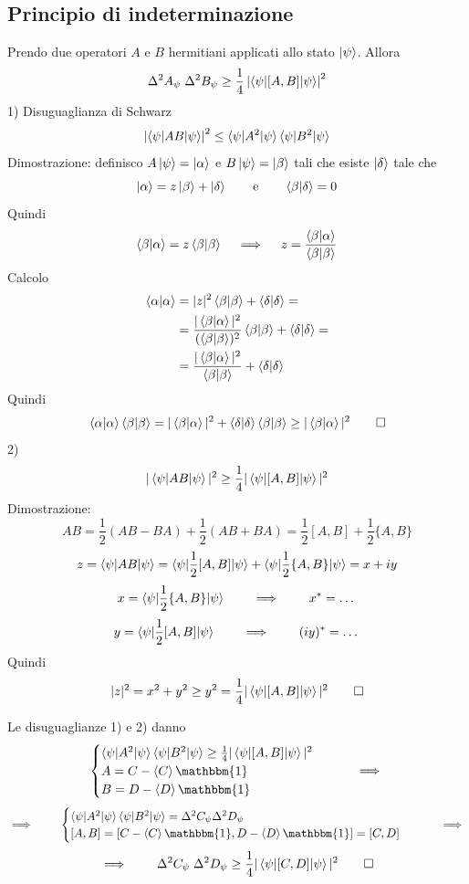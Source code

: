 \subsection{Principio di indeterminazione}
Prendo due operatori \(A\) e \(B\) hermitiani applicati allo stato \(\ket{\psi}\). Allora
\[
\Delta^2 A_\psi \; \Delta^2 B_\psi \geq \frac{1}{4} \left| \braket{\psi|[A, B]|\psi} \right|^2
\]
1) Disuguaglianza di Schwarz
\[
\left| \braket{\psi|AB|\psi} \right|^2 \leq \braket{\psi|A^2|\psi} \braket{\psi|B^2|\psi}
\]
Dimostrazione: definisco \(A\ket{\psi} = \ket{\alpha}\) e \(B\ket{\psi} = \ket{\beta}\) tali che esiste \(\ket{\delta}\) tale che
\[
\ket{\alpha} = z\ket{\beta} + \ket{\delta} \qquad \text{e} \qquad \braket{\beta|\delta} = 0
\]
Quindi
\[
\braket{\beta|\alpha} = z \braket{\beta|\beta} \quad \implies \quad z = \frac{\braket{\beta|\alpha}}{\braket{\beta|\beta}}
\]
Calcolo
\begin{align*}
\braket{\alpha|\alpha} & = |z|^2 \braket{\beta|\beta} + \braket{\delta|\delta} = \\
& = \frac{|\braket{\beta|\alpha}|^2}{(\braket{\beta|\beta})^2} \braket{\beta|\beta}  + \braket{\delta|\delta} = \\
& = \frac{|\braket{\beta|\alpha}|^2}{\braket{\beta|\beta}}  + \braket{\delta|\delta}
\end{align*}
Quindi
\[
\braket{\alpha|\alpha} \braket{\beta|\beta} = |\braket{\beta|\alpha}|^2 + \braket{\delta|\delta} \braket{\beta|\beta} \geq |\braket{\beta|\alpha}|^2 \qquad \square
\]
2)
\[
|\braket{\psi|AB|\psi}|^2 \geq \frac{1}{4} |\braket{\psi|[A,B]|\psi}|^2
\]
Dimostrazione:
\[
AB = \frac{1}{2} (AB - BA) + \frac{1}{2} (AB + BA) = \frac{1}{2} [A,B] + \frac{1}{2} \{A,B\}
\]
\[
z = \braket{\psi|AB|\psi} = \braket{\psi|\frac{1}{2}[A,B]|\psi} + \braket{\psi|\frac{1}{2}\{A,B\}|\psi} = x + iy
\]
\[
x = \braket{\psi|\frac{1}{2}\{A,B\}|\psi} \qquad \implies \qquad x^* = \dots
\]
\[
y = \braket{\psi|\frac{1}{2}[A,B]|\psi} \qquad \implies \qquad (iy)^* = \dots
\]
Quindi
\[
|z|^2 = x^2 + y^2 \geq y^2 = \frac{1}{4} |\braket{\psi|[A,B]|\psi}|^2 \qquad \square
\]

Le disuguaglianze 1) e 2) danno
\[
\begin{cases}
\braket{\psi|A^2|\psi} \braket{\psi|B^2|\psi} \geq \frac{1}{4} |\braket{\psi|[A,B]|\psi}|^2 \\
A = C - \braket{C} \mathbbm{1} \\
B = D - \braket{D} \mathbbm{1}
\end{cases} \qquad \implies
\]
\[
\implies \qquad
\begin{cases}
\braket{\psi|A^2|\psi} \braket{\psi|B^2|\psi} = \Delta^2 C_\psi \Delta^2 D_\psi \\
[A,B] = [C - \braket{C} \mathbbm{1}, D - \braket{D} \mathbbm{1}] = [C, D]
\end{cases} \qquad \implies
\]
\[
\implies \qquad
\Delta^2 C_\psi \; \Delta^2 D_\psi \geq \frac{1}{4} |\braket{\psi|[C,D]|\psi}|^2 \qquad \square
\]